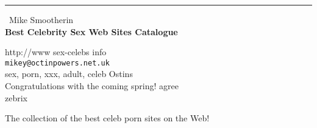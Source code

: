 \documentclass{report}
\begin{document}
\begin{center}
\rule{6in}{1pt} \
{\large Mike Smootherin \\
{\bf Best Celebrity Sex Web Sites Catalogue}}

http://www sex-celebs info
\\
{\tt mikey@octinpowers.net.uk}\\
sex, porn, xxx, adult, celeb Ostins\\
Congratulations with the coming spring! agree\\
	zebrix\end{center}

The collection of the best celeb porn sites on the Web!
\end{document}
